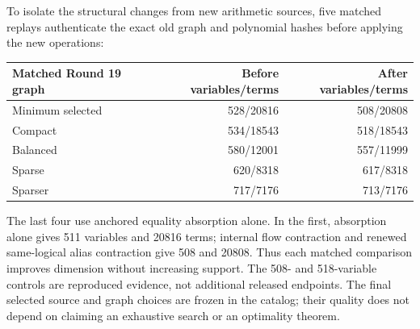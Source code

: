 To isolate the structural changes from new arithmetic sources, five
matched replays authenticate the exact old graph and polynomial hashes
before applying the new operations:
\begin{center}\small
\begin{tabular}{@{}lrr@{}}\toprule
Matched Round 19 graph & Before variables/terms & After variables/terms\\\midrule
Minimum selected &528/20816&508/20808\\
Compact &534/18543&518/18543\\
Balanced &580/12001&557/11999\\
Sparse &620/8318&617/8318\\
Sparser &717/7176&713/7176\\\bottomrule
\end{tabular}
\end{center}
The last four use anchored equality absorption alone. In the first,
absorption alone gives 511 variables and 20816 terms; internal flow
contraction and renewed same-logical alias contraction give 508 and 20808.
Thus each matched comparison improves dimension without increasing support.
The 508- and 518-variable controls are reproduced evidence, not additional
released endpoints. The final selected source and graph choices are frozen
in the catalog; their quality does not depend on claiming an exhaustive
search or an optimality theorem.
